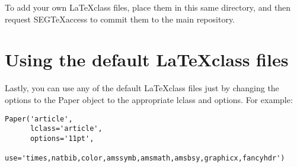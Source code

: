 To add your own \LaTeX class files, place them in this same directory, and then request SEG\TeX access to commit them to the main repository.

\section{Using the default \LaTeX class files}

Lastly, you can use any of the default \LaTeX class files just by changing the options to the Paper object to the appropriate lclass and options. For example:
\begin{lstlisting}
Paper('article',
      lclass='article',
      options='11pt',
      use='times,natbib,color,amssymb,amsmath,amsbsy,graphicx,fancyhdr')
\end{lstlisting}
